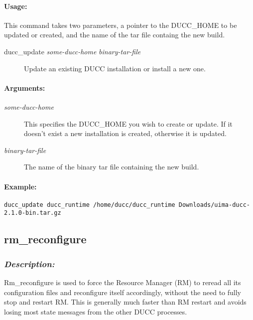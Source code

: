     \paragraph{Usage:}
        This command takes two parameters, a pointer to the DUCC\_HOME to be updated or created,
        and the name of the tar file containg the new build.
    \begin{description}
      \item[ducc\_update {\em some-ducc-home} {\em binary-tar-file}]
        Update an existing DUCC installation or install a new one.
    \end{description}

    \paragraph{Arguments:}
    \begin{description}
        \item[{\em some-ducc-home}] 
          This specifies the DUCC\_HOME you wish to create or update.  If it doesn't exist a new
          installation is created, otherwise it is updated.
        \item[{\em binary-tar-file}]
          The name of the binary tar file containing the new build.
     \end{description}

    \paragraph{Example:}
\begin{verbatim}
ducc_update ducc_runtime /home/ducc/ducc_runtime Downloads/uima-ducc-2.1.0-bin.tar.gz 
\end{verbatim}

\subsection{rm\_reconfigure}
\label{subsec:admin.rm-reconfigure}

    \subsubsection{{\em Description:}}
    Rm\_reconfigure is used to force the Resource Manager (RM) to reread all its configuration
    files and reconfigure itself accordingly, without the need to fully stop and restart RM.
    This is generally much faster than RM restart and avoids losing most state messages from
    the other DUCC processes.
    
